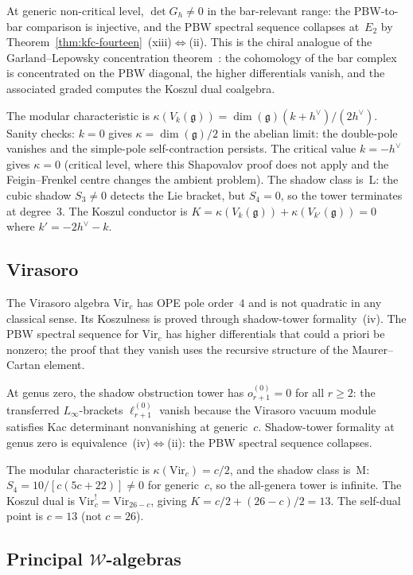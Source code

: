\documentclass[11pt,reqno]{amsart}
\theoremstyle{definition}
\theoremstyle{remark}
\newcommand{\cW}{\mathcal{W}}
\newcommand{\fg}{\mathfrak{g}}
\newcommand{\Vir}{\mathrm{Vir}}
\newcommand{\Etwo}{E_2}
\newcommand{\Linfty}{L_\infty}
\numberwithin{equation}{section}
\begin{document}
At generic non-critical level, $\det G_h \neq 0$ in the
bar-relevant range: the PBW-to-bar comparison is injective, and the
PBW spectral sequence collapses at~$\Etwo$ by
Theorem~\ref{thm:kfc-fourteen}~(xiii)$\Leftrightarrow$(ii).
This is the chiral analogue of the Garland--Lepowsky
concentration theorem~\cite{GL76}: the cohomology of the bar
complex is concentrated on the PBW diagonal, the higher
differentials vanish, and the associated graded computes the
Koszul dual coalgebra.

The modular characteristic is
$\kappa(V_k(\fg)) = \dim(\fg)(k+h^\vee)/(2h^\vee)$.
Sanity checks: $k = 0$ gives $\kappa = \dim(\fg)/2$ in the
abelian limit: the double-pole vanishes and the simple-pole
self-contraction persists. The critical value $k = -h^\vee$
gives $\kappa = 0$
(critical level, where this Shapovalov proof does not apply and
the Feigin--Frenkel centre changes the ambient problem). The shadow class is~L:
the cubic shadow $S_3 \neq 0$ detects the Lie bracket, but
$S_4 = 0$, so the tower terminates at degree~$3$.
The Koszul conductor is
$K = \kappa(V_k(\fg)) + \kappa(V_{k'}(\fg)) = 0$
where $k' = -2h^\vee - k$.

\subsection{Virasoro}

The Virasoro algebra $\Vir_c$ has OPE pole order~$4$ and is not
quadratic in any classical sense. Its Koszulness is proved
through shadow-tower formality~(iv). The PBW spectral sequence
for $\Vir_c$ has higher differentials that could a priori be
nonzero; the proof that they vanish uses the recursive structure
of the Maurer--Cartan element.

At genus zero, the shadow obstruction tower has
$o_{r+1}^{(0)} = 0$ for all $r \geq 2$: the transferred
$\Linfty$-brackets $\ell_{r+1}^{(0)}$ vanish because the
Virasoro vacuum module satisfies Kac determinant nonvanishing at
generic~$c$. Shadow-tower formality at genus zero is
equivalence~(iv)$\Leftrightarrow$(ii): the PBW spectral sequence
collapses.

The modular characteristic is $\kappa(\Vir_c) = c/2$, and the
shadow class is~M: $S_4 = 10/[c(5c+22)] \neq 0$ for generic~$c$,
so the all-genera tower is infinite.
The Koszul dual is $\Vir_c^! = \Vir_{26-c}$, giving
$K = c/2 + (26-c)/2 = 13$.
The self-dual point is $c = 13$ (not $c = 26$).

\subsection{Principal $\cW$-algebras}
\end{document}
